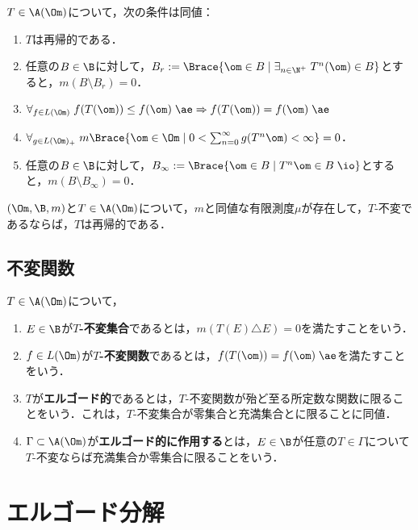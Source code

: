 \documentclass[uplatex,dvipdfmx]{jsreport}
\begin{document}
\begin{theorem}
    $T\in\A(\Om)$について，次の条件は同値：
    \begin{enumerate}
        \item $T$は再帰的である．
        \item 任意の$B\in\B$に対して，$B_r:=\Brace{\om\in B\mid\exists_{n\in\N^+}\;T^n(\om)\in B}$とすると，$m(B\setminus B_r)=0$．
        \item $\forall_{f\in L(\Om)}\;f(T(\om))\le f(\om)\;\ae\Rightarrow f(T(\om))=f(\om)\;\ae$
        \item $\forall_{g\in L(\Om)_+}\;m\Brace{\om\in\Om\mid 0<\sum_{n=0}^\infty g(T^n\om)<\infty}=0$．
        \item 任意の$B\in\B$に対して，$B_\infty:=\Brace{\om\in B\mid T^n\om\in B\;\io}$とすると，$m(B\setminus B_\infty)=0$．
    \end{enumerate}
\end{theorem}

\begin{corollary}[Poincareの再帰定理]
    $(\Om,\B,m)$と$T\in\A(\Om)$について，$m$と同値な有限測度$\mu$が存在して，$T$-不変であるならば，$T$は再帰的である．
\end{corollary}

\subsection{不変関数}

\begin{definition}
    $T\in\A(\Om)$について，
    \begin{enumerate}
        \item $E\in\B$が\textbf{$T$-不変集合}であるとは，$m(T(E)\triangle E)=0$を満たすことをいう．
        \item $f\in L(\Om)$が\textbf{$T$-不変関数}であるとは，$f(T(\om))=f(\om)\;\ae$を満たすことをいう．
        \item $T$が\textbf{エルゴード的}であるとは，$T$-不変関数が殆ど至る所定数な関数に限ることをいう．これは，$T$-不変集合が零集合と充満集合とに限ることに同値．
        \item $\Gamma\subset\A(\Om)$が\textbf{エルゴード的に作用する}とは，$E\in\B$が任意の$T\in\Gamma$について$T$-不変ならば充満集合か零集合に限ることをいう．
    \end{enumerate}
\end{definition}

\section{エルゴード分解}
\end{document}
